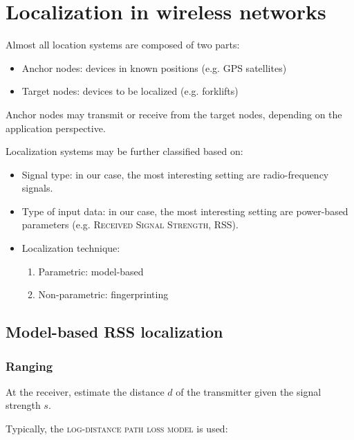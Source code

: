 \documentclass[a4paper,11pt]{article} %
\begin{document}
\section{Localization in wireless networks}\label{localization}
Almost all location systems are composed of two parts:

\smallskip

\begin{itemize}
    \item Anchor nodes: devices in known positions (e.g. GPS satellites)
    \item Target nodes: devices to be localized (e.g. forklifts)
\end{itemize}

\smallskip

Anchor nodes may transmit or receive from the target nodes, depending on the application perspective.

\medskip

Localization systems may be further classified based on:

\begin{itemize}
    \item Signal type: in our case, the most interesting setting are radio-frequency signals.
    \item Type of input data: in our case, the most interesting setting are power-based parameters (e.g. \textsc{Received Signal Strength}, RSS).
    \item Localization technique:
        \begin{enumerate}
            \item Parametric: model-based
            \item Non-parametric: fingerprinting
        \end{enumerate}
\end{itemize}

\subsection{Model-based RSS localization}

\subsubsection{Ranging}

At the receiver, estimate the distance $d$ of the transmitter given the signal strength $s$.

\smallskip

Typically, the \textsc{log-distance path loss model} is used:
\end{document}

